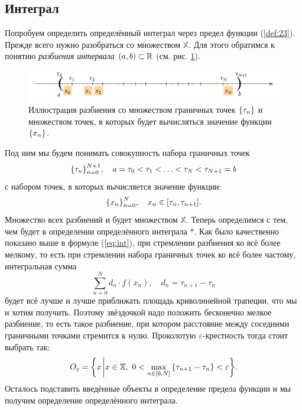 \documentclass[12pt]{article}
\begin{document}
\subsection{Интеграл}
Попробуем определить определённый интеграл через предел функции (\ref{def:23}). Прежде всего нужно разобраться со множеством $\mathbb{X}$. Для этого обратимся к понятию \emph{разбиения интервала $\qty(a,b)\subset \mathbb{R}$} (см. рис. \ref{fig:3}). 
\begin{figure}
    \centering
    \includegraphics[width = 1\textwidth]{fig3.png}
    \caption{Иллюстрация разбиения со множеством граничных точек $\qty{\tau_n}$ и множеством точек, в которых будет вычисляться значение функции $\qty{x_n}$. }
    \label{fig:3}
\end{figure}
Под ним мы будем понимать совокупность набора граничных точек 
\begin{equation}
    \qty{\tau_n}_{n=0}^{N+1}, \quad a=\tau_0<\tau_1<\ldots<\tau_N<\tau_{N+1}=b
\end{equation}
с набором точек, в которых вычисляется значение функции:
\begin{equation}
    \qty{x_n}_{n=0}^N,\quad x_n \in \qty[\tau_n,\tau_{n+1}].
\end{equation}
Множество всех разбиений и будет множеством $\mathbb{X}$. Теперь определимся с тем, чем будет в определении определённого интеграла $*$. Как было качественно показано выше в формуле (\ref{eq:int}), при стремлении разбиения ко всё более мелкому, то есть при стремлении набора граничных точек ко всё более частому, интегральная сумма 
\begin{equation}
    \sum_{n=0}^{N} d_n \cdot f(x_n), \quad d_n = \tau_{n+1} - \tau_{n}
\end{equation}
будет всё лучше и лучше приближать площадь криволинейной трапеции, что мы и хотим получить. Поэтому звёздочкой надо положить бесконечно мелкое разбиение, то есть такое разбиение, при котором расстояние между соседними граничными точками стремится к нулю. Проколотую $\varepsilon$\--крестность тогда стоит выбрать так:
\begin{equation}
    O_\varepsilon = \qty{x\eval x\in \mathbb{X},\ 0<\max_{n\in\qty[0,N]}\qty{\tau_{n+1} - \tau_n}<\varepsilon}.
\end{equation}
Осталось подставить введённые объекты в определение предела функции и мы получим определение определённого интеграла.
\end{document}
